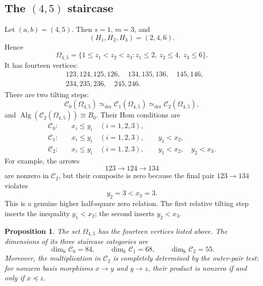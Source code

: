 \documentclass[12pt,a4paper,english,reqno]{amsart}
\theoremstyle{plain}
\newtheorem{proposition}[theorem]{Proposition}
\theoremstyle{definition}
\newcommand{\kk}{\Bbbk}
\newcommand{\C}{\mathcal C}
\begin{document}
\subsection{The \texorpdfstring{$(4,5)$}{(4,5)} staircase}

Let $(a,b)=(4,5)$.  Then $s=1$, $m=3$, and
\[
 (H_1,H_2,H_3)=(2,4,6).
\]
Hence
\[
 \Omega_{4,5}=
 \{1\leq z_1<z_2<z_3:
 z_1\leq2,\ z_2\leq4,\ z_3\leq6\}.
\]
It has fourteen vertices:
\begin{align*}
 &123,124,125,126,\quad
 134,135,136,\quad
 145,146,\\
 &234,235,236,\quad
 245,246.
\end{align*}
There are two tilting steps:
\[
 \C_0(\Omega_{4,5})
 \simeq_{\mathrm{der}}
 \C_1(\Omega_{4,5})
 \simeq_{\mathrm{der}}
 \C_2(\Omega_{4,5}),
\]
and $\operatorname{Alg}(\C_2(\Omega_{4,5}))\cong B_0$.
Their Hom conditions are
\begin{align*}
 \C_0:\quad&
 x_i\leq y_i\quad(i=1,2,3),\\
 \C_1:\quad&
 x_i\leq y_i\quad(i=1,2,3),\qquad y_1<x_2,\\
 \C_2:\quad&
 x_i\leq y_i\quad(i=1,2,3),\qquad
 y_1<x_2,\quad y_2<x_3.
\end{align*}
For example, the arrows
\[
 123\longrightarrow124\longrightarrow134
\]
are nonzero in $\C_2$, but their composite is zero because the final pair
$123\to134$ violates
\[
 y_2=3<x_3=3.
\]
This is a genuine higher half-square zero relation.  The first relative
tilting step inserts the inequality $y_1<x_2$; the second inserts
$y_2<x_3$.

\begin{proposition}
\label{prop:45-full-check}
The set $\Omega_{4,5}$ has the fourteen vertices listed above.  The
dimensions of its three staircase categories are
\[
 \dim_{\kk}\C_0=84,\qquad
 \dim_{\kk}\C_1=68,\qquad
 \dim_{\kk}\C_2=55.
\]
Moreover, the multiplication in $\C_2$ is completely determined by the
outer-pair test: for nonzero basis morphisms $x\to y$ and $y\to z$,
their product is nonzero if and only if $x\preceq z$.
\end{proposition}
\end{document}
